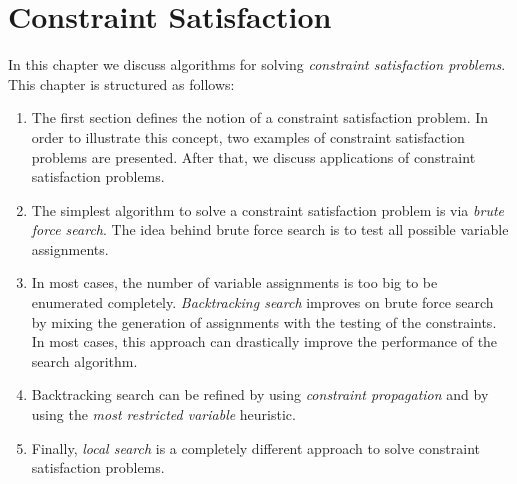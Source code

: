 \chapter{Constraint Satisfaction}
In this chapter we discuss algorithms for solving \emph{\color{blue}constraint satisfaction problems}.
This chapter is structured as follows:
\begin{enumerate}
\item The first section defines the notion of a constraint satisfaction problem.  In order to illustrate this
      concept, two examples of constraint satisfaction problems are presented.  After that, we discuss
      applications of constraint satisfaction problems.
\item The simplest algorithm to solve a constraint satisfaction problem is via \emph{\color{blue}brute force search}.
      The idea behind brute force search is to test all possible variable assignments.
\item In most cases, the number of variable assignments is too big to be enumerated completely.
      \emph{\color{blue}Backtracking search} improves on brute force search by mixing the generation
      of assignments with the testing of the constraints.  In most cases, this approach can
      drastically improve the performance of the search algorithm.
\item Backtracking search can be refined by using \emph{\color{blue}constraint propagation} and by
      using the \emph{\color{blue}most restricted variable} heuristic.
\item Finally, \emph{\color{blue}local search} is a completely different approach to solve
      constraint satisfaction problems.
\end{enumerate}

